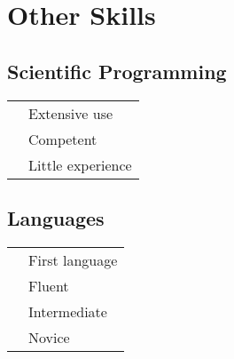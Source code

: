 \documentclass[12pt]{friggeri-cv}
\newcommand{\cvSkillsTwoCols}[2]{
  \begin{minipage}[t]{.5\textwidth}#1\end{minipage}
  \hfill
  \begin{minipage}[t]{.4\textwidth}#2\end{minipage}
}
\begin{document}
\section{Other Skills}
\cvSkillsTwoCols{
\subsection{Scientific Programming}
\vspace{5pt}
\begin{tabular}{rl}
     {\thinfont\color{headercolor}{MATLAB / Julia}} & {Extensive use}\\
     {\thinfont\color{headercolor}{java / C++}} & {Competent}\\
     {\thinfont\color{headercolor}{Ruby / Python / Stan}} & {Little experience}\\
\end{tabular}
}{
\subsection{Languages}
\vspace{5pt}
\begin{tabular}{rl}
     {\thinfont\color{headercolor}{French}} & {First language}  \\
     {\thinfont\color{headercolor}{English}} & {Fluent}\\
     {\thinfont\color{headercolor}{Italian}} & {Intermediate}  \\
     {\thinfont\color{headercolor}{Japanese}} & {Novice}\\
\end{tabular}
}


\newpage
\end{document}
